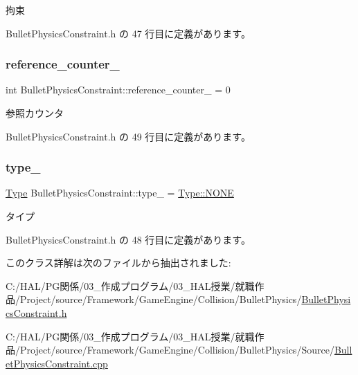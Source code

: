 拘束 



 Bullet\+Physics\+Constraint.\+h の 47 行目に定義があります。

\mbox{\label{class_bullet_physics_constraint_a8d9fae4e261d9e36cf6540edafa37792}} 
\subsubsection{\texorpdfstring{reference\+\_\+counter\+\_\+}{reference\_counter\_}}
{\footnotesize\ttfamily int Bullet\+Physics\+Constraint\+::reference\+\_\+counter\+\_\+ = 0\hspace{0.3cm}{\ttfamily [private]}}



参照カウンタ 



 Bullet\+Physics\+Constraint.\+h の 49 行目に定義があります。

\mbox{\label{class_bullet_physics_constraint_a7f8eee5114f4c45013d052deab208ef4}} 
\subsubsection{\texorpdfstring{type\+\_\+}{type\_}}
{\footnotesize\ttfamily \mbox{\hyperlink{class_bullet_physics_constraint_ad85080d0a6ff58365f4f6fa4c9381e24}{Type}} Bullet\+Physics\+Constraint\+::type\+\_\+ = \mbox{\hyperlink{class_bullet_physics_constraint_ad85080d0a6ff58365f4f6fa4c9381e24ab50339a10e1de285ac99d4c3990b8693}{Type\+::\+N\+O\+NE}}\hspace{0.3cm}{\ttfamily [private]}}



タイプ 



 Bullet\+Physics\+Constraint.\+h の 48 行目に定義があります。



このクラス詳解は次のファイルから抽出されました\+:\begin{DoxyCompactItemize}
\item 
C\+:/\+H\+A\+L/\+P\+G関係/03\+\_\+作成プログラム/03\+\_\+\+H\+A\+L授業/就職作品/\+Project/source/\+Framework/\+Game\+Engine/\+Collision/\+Bullet\+Physics/\mbox{\hyperlink{_bullet_physics_constraint_8h}{Bullet\+Physics\+Constraint.\+h}}\item 
C\+:/\+H\+A\+L/\+P\+G関係/03\+\_\+作成プログラム/03\+\_\+\+H\+A\+L授業/就職作品/\+Project/source/\+Framework/\+Game\+Engine/\+Collision/\+Bullet\+Physics/\+Source/\mbox{\hyperlink{_bullet_physics_constraint_8cpp}{Bullet\+Physics\+Constraint.\+cpp}}\end{DoxyCompactItemize}
